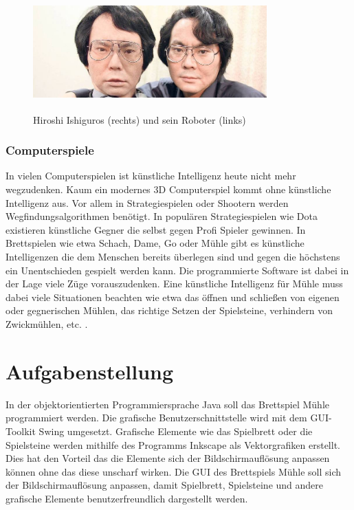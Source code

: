 \documentclass[oneside]{ausarbeitung}
\begin{document}
\begin{figure}[ht]
	\centering
	\includegraphics[width=9cm,height=4.5cm]{images/roboter.jpg}
	\caption[Hiroshi Ishiguros (rechts) und sein Roboter (links)]{Hiroshi Ishiguros (rechts) und sein Roboter (links)}
\end{figure} 

\subsection{Computerspiele}

In vielen Computerspielen ist künstliche Intelligenz heute nicht mehr wegzudenken. Kaum ein modernes 3D Computerspiel kommt ohne künstliche Intelligenz aus. Vor allem in Strategiespielen oder Shootern werden Wegfindungsalgorithmen benötigt. In populären Strategiespielen wie Dota existieren künstliche Gegner die selbst gegen Profi Spieler gewinnen. In Brettspielen wie etwa Schach, Dame, Go oder Mühle gibt es künstliche Intelligenzen die dem Menschen bereits überlegen sind und gegen die höchstens ein Unentschieden gespielt werden kann. Die programmierte Software ist dabei in der Lage viele Züge vorauszudenken. Eine künstliche Intelligenz für Mühle muss dabei viele Situationen beachten wie etwa das öffnen und schließen von eigenen oder gegnerischen Mühlen, das richtige Setzen der Spielsteine, verhindern von Zwickmühlen, etc. .  

\chapter{Aufgabenstellung}

In der objektorientierten Programmiersprache Java soll das Brettspiel Mühle programmiert werden. Die grafische Benutzerschnittstelle wird mit dem GUI-Toolkit Swing umgesetzt. Grafische Elemente wie das Spielbrett oder die Spielsteine werden mithilfe des Programms Inkscape als Vektorgrafiken erstellt. Dies hat den Vorteil das die Elemente sich der Bildschirmauflösung anpassen können ohne das diese unscharf wirken. Die GUI des Brettspiels Mühle soll sich der Bildschirmauflösung anpassen, damit Spielbrett, Spielsteine und andere grafische Elemente benutzerfreundlich dargestellt werden.
\end{document}
